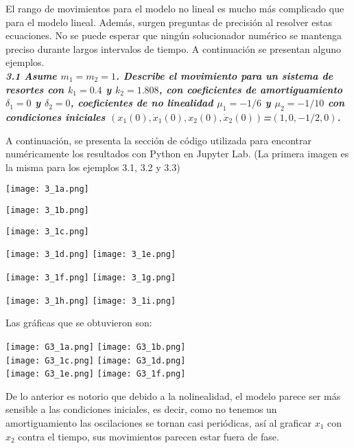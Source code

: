 \documentclass[12pt]{article}
\begin{document}
El rango de movimientos para el modelo no lineal es mucho más complicado que
para el modelo lineal. Además, surgen preguntas de precisión al resolver estas ecuaciones. No se puede esperar que ningún solucionador numérico se mantenga preciso durante largos intervalos de tiempo. A continuación se presentan alguno ejemplos.\\


\textbf{\textit{3.1 Asume $m_1=m_2=1$. Describe el movimiento para un sistema de resortes con $k_1=0.4$ y $k_2=1.808$, con coeficientes de amortiguamiento $\delta_1=0$ y $\delta_2=0$, coeficientes de no linealidad $\mu_1=-1/6$ y $\mu_2=-1/10$ con condiciones iniciales $(x_1(0), \dot x_1(0), x_2(0), \dot x_2(0))$=$(1,0,-1/2,0)$.}\\}

A continuación, se presenta la sección de código utilizada para encontrar numéricamente los resultados con Python en Jupyter Lab. (La primera imagen es la misma para los ejemplos 3.1, 3.2 y 3.3) \\
\begin{center}
	\texttt{[image: 3\_1a.png]}
\end{center}
\begin{center}
    \texttt{[image: 3\_1b.png]}
\end{center}
\begin{center}
    \texttt{[image: 3\_1c.png]}
\end{center}
\begin{center}
    \texttt{[image: 3\_1d.png]}\hspace*{\fill}
    \texttt{[image: 3\_1e.png]}
\end{center}
\begin{center}
    \texttt{[image: 3\_1f.png]}\hspace*{\fill}
    \texttt{[image: 3\_1g.png]}
\end{center}
\begin{center}
    \texttt{[image: 3\_1h.png]}\hspace*{\fill}
    \texttt{[image: 3\_1i.png]}
\end{center}
Las gráficas que se obtuvieron son:
\begin{center}
    \texttt{[image: G3\_1a.png]}\hspace*{\fill}
    \texttt{[image: G3\_1b.png]}\\
     \texttt{[image: G3\_1c.png]}\hspace*{\fill}
    \texttt{[image: G3\_1d.png]}\\
     \texttt{[image: G3\_1e.png]}\hspace*{\fill}
    \texttt{[image: G3\_1f.png]}\\
\end{center}
De lo anterior es notorio que debido a la nolinealidad, el modelo parece ser más sensible a las condiciones iniciales, es decir, como no tenemos un amortiguamiento las oscilaciones se tornan casi periódicas, así al graficar $x_1$ con $x_2$ contra el tiempo, sus movimientos parecen estar fuera de fase.\\
\end{document}
